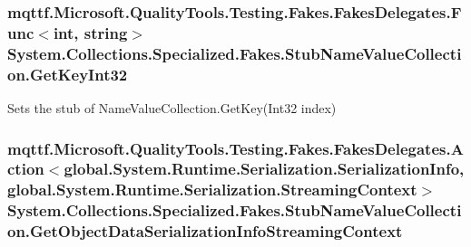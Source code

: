 \hypertarget{class_system_1_1_collections_1_1_specialized_1_1_fakes_1_1_stub_name_value_collection_a8a5f258ee22197d723b183c8cf2010f3}{
\subsubsection[{Get\-Key\-Int32}]{\setlength{\rightskip}{0pt plus 5cm}mqttf.\-Microsoft.\-Quality\-Tools.\-Testing.\-Fakes.\-Fakes\-Delegates.\-Func$<$int, string$>$ System.\-Collections.\-Specialized.\-Fakes.\-Stub\-Name\-Value\-Collection.\-Get\-Key\-Int32}}\label{class_system_1_1_collections_1_1_specialized_1_1_fakes_1_1_stub_name_value_collection_a8a5f258ee22197d723b183c8cf2010f3}


Sets the stub of Name\-Value\-Collection.\-Get\-Key(\-Int32 index)

\hypertarget{class_system_1_1_collections_1_1_specialized_1_1_fakes_1_1_stub_name_value_collection_ab18deba6e61e5a4ee11f66c96ebb7797}{
\subsubsection[{Get\-Object\-Data\-Serialization\-Info\-Streaming\-Context}]{\setlength{\rightskip}{0pt plus 5cm}mqttf.\-Microsoft.\-Quality\-Tools.\-Testing.\-Fakes.\-Fakes\-Delegates.\-Action$<$global.\-System.\-Runtime.\-Serialization.\-Serialization\-Info, global.\-System.\-Runtime.\-Serialization.\-Streaming\-Context$>$ System.\-Collections.\-Specialized.\-Fakes.\-Stub\-Name\-Value\-Collection.\-Get\-Object\-Data\-Serialization\-Info\-Streaming\-Context}}\label{class_system_1_1_collections_1_1_specialized_1_1_fakes_1_1_stub_name_value_collection_ab18deba6e61e5a4ee11f66c96ebb7797}


